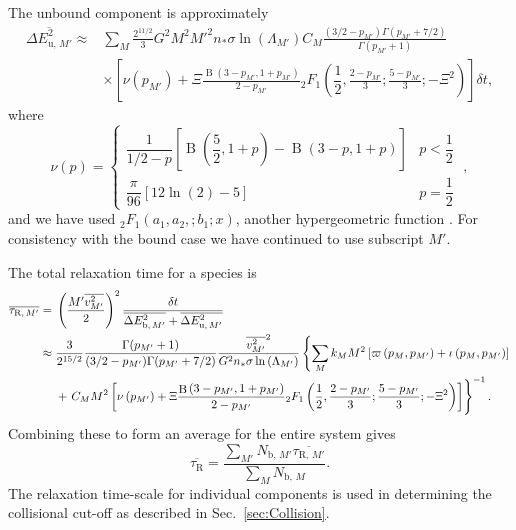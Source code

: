 \documentclass[useAMS,usedcolumn,usegraphicx,usenatbib]{mn2e}
\newcommand{\secref}[1]{Sec.~\ref{sec:#1}}
\DeclareMathOperator{\Beta}{B}
\newcommand{\recip}[1]{\ensuremath{\dfrac{1}{#1}}}
\begin{document}
\begin{onecolumn}
The unbound component is approximately
\begin{align}
\overline{\Delta E^2_{\mathrm{u},\,M'}} \approx {} & \sum_M\frac{2^{11/2}}{3}G^2M^2{M'}^2n_\ast\sigma\ln\left(\Lambda_{M'}\right) C_M \frac{(3/2 - p_{M'})\Gamma(p_{M'} + 7/2)}{\Gamma(p_{M'} + 1)} \nonumber \\
  & \times \left[\nu\left(p_{M'}\right) + \Xi\frac{\Beta\left(3-p_{M'},1+p_{M'}\right)}{2-p_{M'}}{_2F_1}\left(\recip{2},\frac{2-p_{M'}}{3};\frac{5-p_{M'}}{3};-\Xi^2\right) \right] \delta t,
\end{align}
where
\begin{equation}
\nu(p) = \begin{cases} \recip{1/2 - p}\left[\Beta\left(\dfrac{5}{2},1+p\right) - \Beta\left(3-p,1+p\right)\right] & p < \recip{2} \\
\dfrac{\pi}{96}\left[12 \ln(2) - 5\right] & p = \recip{2}
\end{cases} \; ,
\end{equation}
and we have used ${_2F_1}(a_1,a_2,;b_1;x)$, another hypergeometric function \citep[15.6.1]{Olver2010}. For consistency with the bound case we have continued to use subscript $M'$. 

The total relaxation time for a species is
\begin{align}
\overline{\tau_{\mathrm{R,}\,M'}} = {} & \left(\frac{{M'}\overline{v_{M'}^2}}{2}\right)^2\frac{\delta t}{\overline{\Delta E^2_{\mathrm{b},\,M'}} + \overline{\Delta E^2_{\mathrm{u},\,M'}}} \\
 \approx {} & \frac{3}{2^{15/2}}\frac{\Gamma(p_{M'} + 1)}{(3/2 - p_{M'})\Gamma(p_{M'} + 7/2)}\frac{\overline{v_{M'}^2}^2}{G^2n_\ast\sigma\ln\left(\Lambda_{M'}\right)} \left\{\sum_M k_M M^2 \left[ \varpi\left(p_M,p_{M'}\right) + \iota \left(p_M,p_{M'}\right)\right] \right. \nonumber \\*
  & + \left. \vphantom{ \left[ \frac{p_{M'}^2\left(6 + 9p_M + 8p_M^2\right)}{210}\right]} C_M M^2 \left[\nu\left(p_{M'}\right) + \Xi\frac{\Beta\left(3-p_{M'},1+p_{M'}\right)}{2-p_{M'}}{_2F_1}\left(\recip{2},\frac{2-p_{M'}}{3};\frac{5-p_{M'}}{3};-\Xi^2\right)\right]\right\}^{-1}.
\end{align}
Combining these to form an average for the entire system gives
\begin{equation}
\overline{\tau_{\mathrm{R}}} = \frac{\sum_{M'}N_{\mathrm{b,}\,M'}\overline{\tau_{\mathrm{R,}\,M'}}}{\sum_{M}N_{\mathrm{b,}\,M}}.
\label{eq:system-relax}
\end{equation}
The relaxation time-scale for individual components is used in determining the collisional cut-off as described in \secref{Collision}.


\end{onecolumn}
\end{document}
